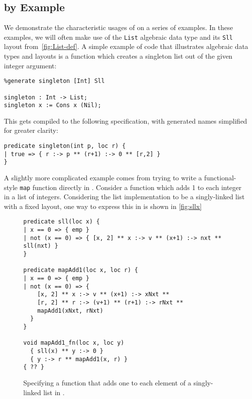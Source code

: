 \subsection{\Pika{} by Example}

We demonstrate the characteristic usages of \Pika{} on a series of
examples.
%
In these examples, we will often make use of the \verb|List| algebraic
data type and its \verb|Sll| layout from~\autoref{fig:List-def}. A
simple example of \Pika{} code that illustrates algebraic data types and
layouts is a function which creates a singleton list out of the given
integer argument:

\begin{lstlisting}
%generate singleton [Int] Sll

singleton : Int -> List;
singleton x := Cons x (Nil);
\end{lstlisting}

\noindent
This gets compiled to the following \SuSLik{} specification, with generated names simplified for greater clarity:

\begin{lstlisting}
predicate singleton(int p, loc r) {
| true => { r :-> p ** (r+1) :-> 0 ** [r,2] }
}
\end{lstlisting}

\noindent
A slightly more complicated example comes from trying to write a
functional-style \verb|map| function directly in \SuSLik. Consider a
function which adds 1 to each integer in a list of integers.
Considering the list implementation to be a singly-linked list with a
fixed layout, one way to express this in \SuSLik{} is shown in \autoref{fig:sllx}

\begin{figure}[t]
\begin{lstlisting}
predicate sll(loc x) {
| x == 0 => { emp }
| not (x == 0) => { [x, 2] ** x :-> v ** (x+1) :-> nxt ** sll(nxt) }
}

predicate mapAdd1(loc x, loc r) {
| x == 0 => { emp }
| not (x == 0) => {
    [x, 2] ** x :-> v ** (x+1) :-> xNxt **
    [r, 2] ** r :-> (v+1) ** (r+1) :-> rNxt **
    mapAdd1(xNxt, rNxt)
  }
}

void mapAdd1_fn(loc x, loc y)
  { sll(x) ** y :-> 0 }
  { y :-> r ** mapAdd1(x, r) }
{ ?? }
\end{lstlisting}
\caption{Specifying a function that adds one to each element of a
  singly-linked list in \SuSLik.}
\label{fig:sllx}
\end{figure}

